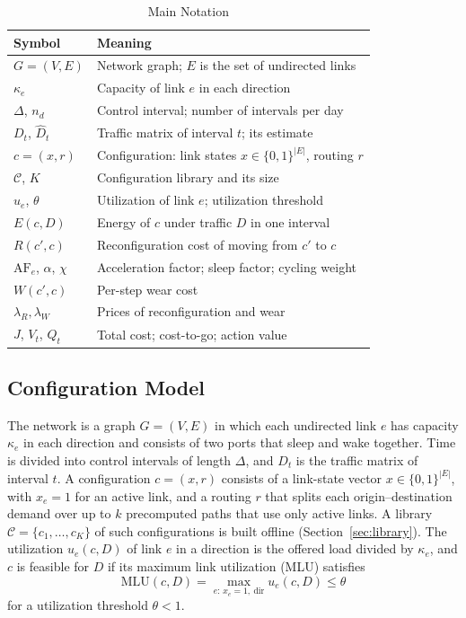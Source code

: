 \documentclass[journal]{IEEEtran}
\begin{document}
\begin{table}[t]
\centering
\caption{Main Notation}
\label{tab:notation}
\footnotesize
\setlength{\tabcolsep}{3pt}
\begin{tabular}{@{}p{1.85cm}p{6.5cm}@{}}
\toprule
Symbol & Meaning \\
\midrule
$G=(V,E)$ & Network graph; $E$ is the set of undirected links \\
$\kappa_e$ & Capacity of link $e$ in each direction \\
$\Delta$, $n_d$ & Control interval; number of intervals per day \\
$D_t$, $\hat D_t$ & Traffic matrix of interval $t$; its estimate \\
$c=(x,r)$ & Configuration: link states $x\in\{0,1\}^{|E|}$, routing $r$ \\
$\mathcal{C}$, $K$ & Configuration library and its size \\
$u_e$, $\theta$ & Utilization of link $e$; utilization threshold \\
$E(c,D)$ & Energy of $c$ under traffic $D$ in one interval \\
$R(c',c)$ & Reconfiguration cost of moving from $c'$ to $c$ \\
$\mathrm{AF}_e$, $\alpha$, $\chi$ & Acceleration factor; sleep factor; cycling weight \\
$W(c',c)$ & Per-step wear cost \\
$\lambda_R,\lambda_W$ & Prices of reconfiguration and wear \\
$J$, $V_t$, $Q_t$ & Total cost; cost-to-go; action value \\
\bottomrule
\end{tabular}
\end{table}

\subsection{Configuration Model}

The network is a graph $G=(V,E)$ in which each undirected link $e$ has capacity $\kappa_e$ in each direction and consists of two ports that sleep and wake together. Time is divided into control intervals of length $\Delta$, and $D_t$ is the traffic matrix of interval $t$. A configuration $c=(x,r)$ consists of a link-state vector $x\in\{0,1\}^{|E|}$, with $x_e=1$ for an active link, and a routing $r$ that splits each origin--destination demand over up to $k$ precomputed paths that use only active links. A library $\mathcal{C}=\{c_1,\dots,c_K\}$ of such configurations is built offline (Section~\ref{sec:library}). The utilization $u_e(c,D)$ of link $e$ in a direction is the offered load divided by $\kappa_e$, and $c$ is feasible for $D$ if its maximum link utilization (MLU) satisfies
\begin{equation}\label{eq:mlu}
\mathrm{MLU}(c,D)=\max_{e:\,x_e=1,\ \mathrm{dir}}u_e(c,D)\le\theta
\end{equation}
for a utilization threshold $\theta<1$.
\end{document}
